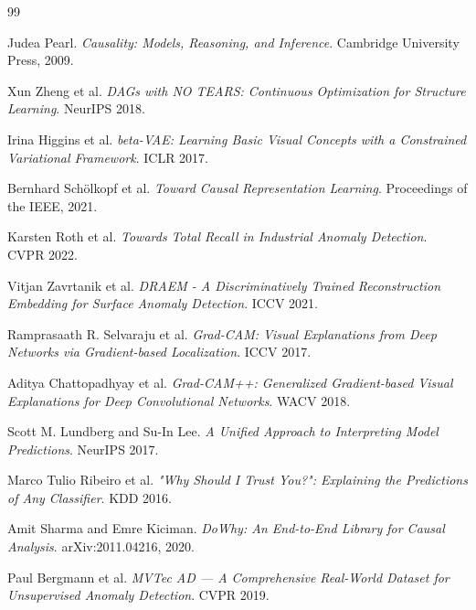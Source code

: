 \documentclass{article}
\begin{document}

\begin{thebibliography}{99}

 Judea Pearl. \emph{Causality: Models, Reasoning, and Inference}. Cambridge University Press, 2009.

 Xun Zheng et al. \emph{DAGs with NO TEARS: Continuous Optimization for Structure Learning}. NeurIPS 2018.

 Irina Higgins et al. \emph{beta-VAE: Learning Basic Visual Concepts with a Constrained Variational Framework}. ICLR 2017.

 Bernhard Sch{\"o}lkopf et al. \emph{Toward Causal Representation Learning}. Proceedings of the IEEE, 2021.

 Karsten Roth et al. \emph{Towards Total Recall in Industrial Anomaly Detection}. CVPR 2022.

 Vitjan Zavrtanik et al. \emph{DRAEM - A Discriminatively Trained Reconstruction Embedding for Surface Anomaly Detection}. ICCV 2021.

 Ramprasaath R. Selvaraju et al. \emph{Grad-CAM: Visual Explanations from Deep Networks via Gradient-based Localization}. ICCV 2017.

 Aditya Chattopadhyay et al. \emph{Grad-CAM++: Generalized Gradient-based Visual Explanations for Deep Convolutional Networks}. WACV 2018.

 Scott M. Lundberg and Su-In Lee. \emph{A Unified Approach to Interpreting Model Predictions}. NeurIPS 2017.

 Marco Tulio Ribeiro et al. \emph{"Why Should I Trust You?": Explaining the Predictions of Any Classifier}. KDD 2016.

 Amit Sharma and Emre Kiciman. \emph{DoWhy: An End-to-End Library for Causal Analysis}. arXiv:2011.04216, 2020.

 Paul Bergmann et al. \emph{MVTec AD — A Comprehensive Real-World Dataset for Unsupervised Anomaly Detection}. CVPR 2019.

\end{thebibliography}
\end{document}
